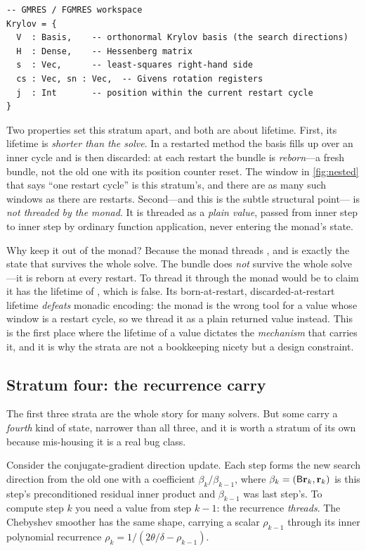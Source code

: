 \begin{lstlisting}[style=l4style]
-- GMRES / FGMRES workspace
Krylov = {
  V  : Basis,    -- orthonormal Krylov basis (the search directions)
  H  : Dense,    -- Hessenberg matrix
  s  : Vec,      -- least-squares right-hand side
  cs : Vec, sn : Vec,  -- Givens rotation registers
  j  : Int       -- position within the current restart cycle
}
\end{lstlisting}

Two properties set this stratum apart, and both are about lifetime. First, its
lifetime is \emph{shorter than the solve}. In a restarted method the basis
 fills up over an inner cycle and is then discarded: at each restart the
 bundle is \emph{reborn}---a fresh bundle, not the old one with its
position counter reset. The window in \cref{fig:nested} that says ``one restart
cycle'' is this stratum's, and there are as many such windows as there are
restarts. Second---and this is the subtle structural point--- is
\emph{not threaded by the monad}. It is threaded as a \emph{plain value},
passed from inner step to inner step by ordinary function application, never
entering the  monad's state.

Why keep it out of the monad? Because the monad threads , and
 is exactly the state that survives the whole solve. The
 bundle does \emph{not} survive the whole solve---it is reborn at
every restart. To thread it through the monad would be to claim it has the
lifetime of , which is false. Its born-at-restart,
discarded-at-restart lifetime \emph{defeats} monadic encoding: the monad is the
wrong tool for a value whose window is a restart cycle, so we thread it as a
plain returned value instead. This is the first place where the lifetime of a
value dictates the \emph{mechanism} that carries it, and it is why the strata are
not a bookkeeping nicety but a design constraint.

\subsection{Stratum four: the recurrence carry}

The first three strata are the whole story for many solvers. But some carry a
\emph{fourth} kind of state, narrower than all three, and it is worth a stratum
of its own because mis-housing it is a real bug class.

Consider the conjugate-gradient direction update. Each step forms the new search
direction from the old one with a coefficient $\beta_k/\beta_{k-1}$, where
$\beta_k = (\mathsf{B}\mathbf{r}_k, \mathbf{r}_k)$ is this step's preconditioned residual inner
product and $\beta_{k-1}$ was last step's. To compute step $k$ you need a value
from step $k-1$: the recurrence \emph{threads}. The Chebyshev smoother has the
same shape, carrying a scalar $\rho_{k-1}$ through its inner polynomial
recurrence $\rho_k = 1/(2\theta/\delta - \rho_{k-1})$.

